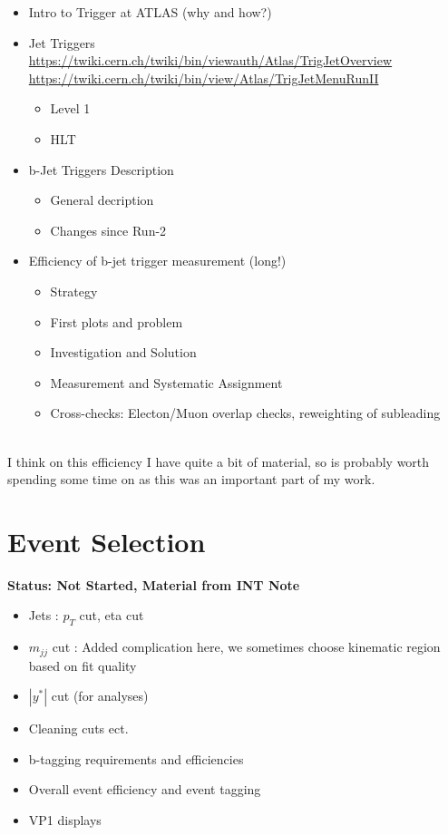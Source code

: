   \begin{itemize}
  \item{Intro to Trigger at ATLAS (why and how?)}
  \item{Jet Triggers}\\
    \url{https://twiki.cern.ch/twiki/bin/viewauth/Atlas/TrigJetOverview}\\%
    \url{https://twiki.cern.ch/twiki/bin/view/Atlas/TrigJetMenuRunII}%
    \begin{itemize}[label={$-$}]
    \item{Level 1}
    \item{HLT}
    \end{itemize}
  \item{b-Jet Triggers Description}
    \begin{itemize}[label={$-$}]
    \item{General decription}
    \item{Changes since Run-2}
    \end{itemize}
  \item{Efficiency of b-jet trigger measurement (long!) }
    \begin{itemize}[label={$-$}]
    \item{Strategy}
    \item{First plots and problem}
    \item{Investigation and Solution}
    \item{Measurement and Systematic Assignment}
    \item{Cross-checks: Electon/Muon overlap checks, reweighting of subleading}
    \end{itemize}
  \end{itemize}

  \noindent\\
  I think on this efficiency I have quite a bit of material, so is probably worth spending some time on as this was an important part of my work.\\

\section{Event Selection}

\textbf{Status: Not Started, Material from INT Note}

  \begin{itemize}
  \item{Jets : $p_{T}$ cut, eta cut}
  \item{$m_{jj}$ cut : Added complication here, we sometimes choose kinematic region based on fit quality}
  \item{$|y^*|$ cut (for analyses)}
  \item{Cleaning cuts ect.}
  \item{b-tagging requirements and efficiencies}
  \item{Overall event efficiency and event tagging}
  \item{VP1 displays}
  \end{itemize}

